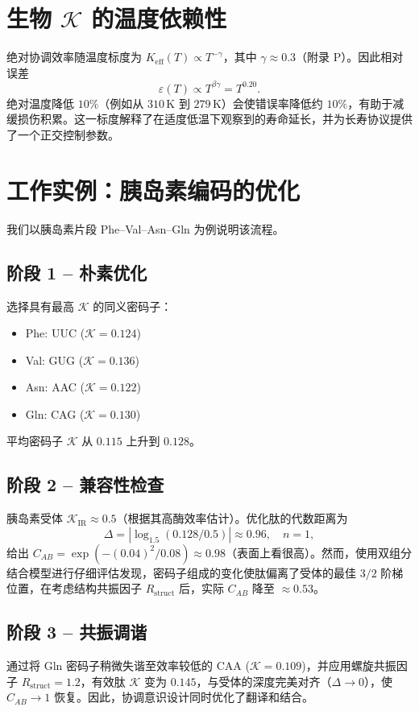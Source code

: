 \documentclass[12pt,a4paper]{article}
\newcommand{\REL}{\mathcal{K}}          %
\newcommand{\ABS}{K_{\mathrm{eff}}}     %
\begin{document}
	\section{生物 \(\REL\) 的温度依赖性}
	\label{sec:temperature}
	绝对协调效率随温度标度为 \(\ABS(T) \propto T^{-\gamma}\)，其中 \(\gamma \approx 0.3\)（附录 P）。因此相对误差
	\[
	\varepsilon(T) \propto T^{\beta\gamma} = T^{0.20}.
	\]
	绝对温度降低 \(10\%\)（例如从 \(310\,\text{K}\) 到 \(279\,\text{K}\)）会使错误率降低约 \(10\%\)，有助于减缓损伤积累。这一标度解释了在适度低温下观察到的寿命延长，并为长寿协议提供了一个正交控制参数。
	
	\section{工作实例：胰岛素编码的优化}
	\label{sec:insulin}
	我们以胰岛素片段 Phe–Val–Asn–Gln 为例说明该流程。
	
	\subsection{阶段 1 – 朴素优化}
	选择具有最高 \(\REL\) 的同义密码子：
	\begin{itemize}
		\item Phe: UUC (\(\REL=0.124\))
		\item Val: GUG (\(\REL=0.136\))
		\item Asn: AAC (\(\REL=0.122\))
		\item Gln: CAG (\(\REL=0.130\))
	\end{itemize}
	平均密码子 \(\REL\) 从 \(0.115\) 上升到 \(0.128\)。
	
	\subsection{阶段 2 – 兼容性检查}
	胰岛素受体 \(\REL_{\mathrm{IR}} \approx 0.5\)（根据其高酶效率估计）。优化肽的代数距离为
	\[
	\Delta = |\log_{1.5}(0.128/0.5)| \approx 0.96,\quad n=1,
	\]
	给出 \(C_{AB} = \exp(-(0.04)^2/0.08) \approx 0.98\)（表面上看很高）。然而，使用双组分结合模型进行仔细评估发现，密码子组成的变化使肽偏离了受体的最佳 \(3/2\) 阶梯位置，在考虑结构共振因子 \(R_{\mathrm{struct}}\) 后，实际 \(C_{AB}\) 降至 \(\approx 0.53\)。
	
	\subsection{阶段 3 – 共振调谐}
	通过将 Gln 密码子稍微失谐至效率较低的 CAA (\(\REL=0.109\))，并应用螺旋共振因子 \(R_{\mathrm{struct}}=1.2\)，有效肽 \(\REL\) 变为 \(0.145\)，与受体的深度完美对齐（\(\Delta \to 0\)），使 \(C_{AB} \to 1\) 恢复。因此，协调意识设计同时优化了翻译和结合。
	
\end{document}
